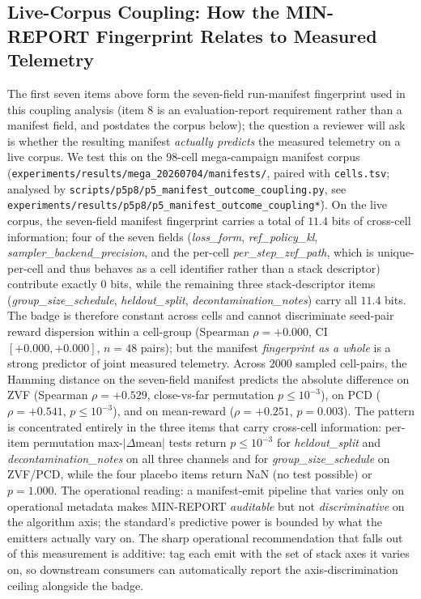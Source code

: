 \documentclass{article}  \usepackage[preprint,nonatbib]{neurips_2026} \usepackage[numbers]{natbib}
\begin{document}
\subsection{Live-Corpus Coupling: How the MIN-REPORT Fingerprint Relates to Measured Telemetry}
\label{sec:p5-live-coupling}
The first seven items above form the seven-field run-manifest fingerprint used in this
coupling analysis (item 8 is an evaluation-report requirement rather than
a manifest field, and postdates the corpus below); the question a
reviewer will ask is whether the resulting manifest \emph{actually predicts}
the measured telemetry on a live corpus. We test this on the
98-cell mega-campaign manifest corpus
(\texttt{experiments/results/mega\_20260704/manifests/}, paired with
\texttt{cells.tsv}; analysed by
\texttt{scripts/p5p8/p5\_manifest\_outcome\_coupling.py}, see
\texttt{experiments/results/p5p8/p5\_manifest\_outcome\_coupling\.*}). On
the live corpus, the seven-field manifest fingerprint carries a total of
$11.4$ bits of cross-cell information; four of the seven fields
(\textit{loss\_form}, \textit{ref\_policy\_kl},
\textit{sampler\_backend\_precision}, and the per-cell
\textit{per\_step\_zvf\_path}, which is unique-per-cell and thus
behaves as a cell identifier rather than a stack descriptor) contribute
exactly $0$ bits, while the remaining three stack-descriptor items
(\textit{group\_size\_schedule}, \textit{heldout\_split},
\textit{decontamination\_notes}) carry all $11.4$ bits. The badge is
therefore constant across cells and cannot discriminate seed-pair
reward dispersion within a cell-group (Spearman $\rho = +0.000$, CI
$[+0.000, +0.000]$, $n=48$ pairs); but the manifest \emph{fingerprint as a
whole} is a strong predictor of joint measured telemetry. Across
$2000$ sampled cell-pairs, the Hamming distance on the seven-field manifest
predicts the absolute difference on ZVF (Spearman $\rho = +0.529$,
close-vs-far permutation $p \le 10^{-3}$), on PCD
($\rho = +0.541$, $p \le 10^{-3}$), and on mean-reward
($\rho = +0.251$, $p = 0.003$). The pattern is concentrated entirely in
the three items that carry cross-cell information: per-item permutation
max-$|\Delta\text{mean}|$ tests return $p \le 10^{-3}$ for
\textit{heldout\_split} and \textit{decontamination\_notes} on all three
channels and for \textit{group\_size\_schedule} on ZVF/PCD, while the
four placebo items return NaN (no test possible) or $p = 1.000$. The
operational reading: a manifest-emit pipeline that varies only on
operational metadata makes MIN-REPORT \emph{auditable} but not
\emph{discriminative} on the algorithm axis; the standard's predictive
power is bounded by what the emitters actually vary on. The sharp
operational recommendation that falls out of this measurement is
additive: tag each emit with the set of stack axes it varies on, so
downstream consumers can automatically report the axis-discrimination
ceiling alongside the badge.
\end{document}
